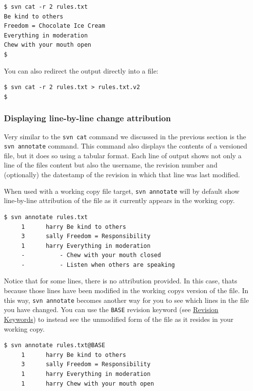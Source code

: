 \begin{verbatim}
$ svn cat -r 2 rules.txt
Be kind to others
Freedom = Chocolate Ice Cream
Everything in moderation
Chew with your mouth open
$
\end{verbatim}

You can also redirect the output directly into a file:

\begin{verbatim}
$ svn cat -r 2 rules.txt > rules.txt.v2
$
\end{verbatim}

\subsubsection{Displaying line-by-line change
attribution}\label{svn.tour.history.browsing.annotate}

Very similar to the \texttt{svn\ cat} command we discussed in the
previous section is the \texttt{svn\ annotate} command. This command
also displays the contents of a versioned file, but it does so using a
tabular format. Each line of output shows not only a line of the
file\textquotesingle s content but also the username, the revision
number and (optionally) the datestamp of the revision in which that line
was last modified.

When used with a working copy file target, \texttt{svn\ annotate} will
by default show line-by-line attribution of the file as it currently
appears in the working copy.

\begin{verbatim}
$ svn annotate rules.txt
     1      harry Be kind to others
     3      sally Freedom = Responsibility
     1      harry Everything in moderation
     -          - Chew with your mouth closed
     -          - Listen when others are speaking
\end{verbatim}

Notice that for some lines, there is no attribution provided. In this
case, that\textquotesingle s because those lines have been modified in
the working copy\textquotesingle s version of the file. In this way,
\texttt{svn\ annotate} becomes another way for you to see which lines in
the file you have changed. You can use the \texttt{BASE} revision
keyword (see \hyperref[svn.tour.revs.keywords]{Revision Keywords}) to
instead see the unmodified form of the file as it resides in your
working copy.

\begin{verbatim}
$ svn annotate rules.txt@BASE
     1      harry Be kind to others
     3      sally Freedom = Responsibility
     1      harry Everything in moderation
     1      harry Chew with your mouth open
\end{verbatim}

